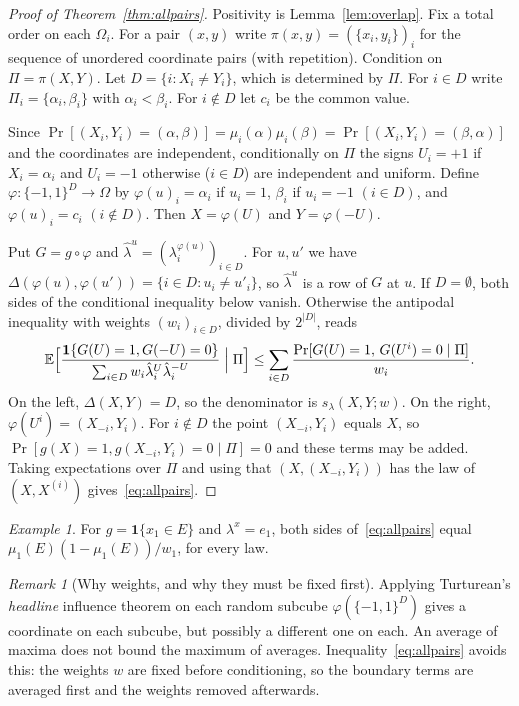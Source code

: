 \documentclass[11pt]{article}
\numberwithin{equation}{section}
\theoremstyle{definition}
\theoremstyle{remark}
\newtheorem{remark}[theorem]{Remark}
\newtheorem{example}[theorem]{Example}
\newcommand{\E}{\mathbb{E}}
\newcommand{\1}{\mathbf 1}
\begin{document}
\begin{proof}[Proof of Theorem~\ref{thm:allpairs}]
Positivity is Lemma~\ref{lem:overlap}. Fix a total order on each $\Omega_i$. For a pair $(x,y)$ write $\pi(x,y)=(\{x_i,y_i\})_{i}$ for the sequence of unordered coordinate pairs (with repetition). Condition on $\Pi=\pi(X,Y)$. Let $D=\{i:X_i\ne Y_i\}$, which is determined by $\Pi$. For $i\in D$ write $\Pi_i=\{\alpha_i,\beta_i\}$ with $\alpha_i<\beta_i$. For $i\notin D$ let $c_i$ be the common value.

Since $\Pr[(X_i,Y_i)=(\alpha,\beta)]=\mu_i(\alpha)\mu_i(\beta)=\Pr[(X_i,Y_i)=(\beta,\alpha)]$ and the coordinates are independent, conditionally on $\Pi$ the signs $U_i=+1$ if $X_i=\alpha_i$ and $U_i=-1$ otherwise ($i\in D$) are independent and uniform. Define $\varphi:\{-1,1\}^D\to\Omega$ by $\varphi(u)_i=\alpha_i$ if $u_i=1$, $\beta_i$ if $u_i=-1$ $(i\in D)$, and $\varphi(u)_i=c_i$ $(i\notin D)$. Then $X=\varphi(U)$ and $Y=\varphi(-U)$.

Put $G=g\circ\varphi$ and $\hat\lambda^u=(\lambda^{\varphi(u)}_i)_{i\in D}$. For $u,u'$ we have $\Delta(\varphi(u),\varphi(u'))=\{i\in D:u_i\ne u'_i\}$, so $\hat\lambda^u$ is a row of $G$ at $u$. If $D=\emptyset$, both sides of the conditional inequality below vanish. Otherwise the antipodal inequality with weights $(w_i)_{i\in D}$, divided by $2^{|D|}$, reads
\[
\E\Bigl[\frac{\1\{G(U)=1,G(-U)=0\}}{\sum_{i\in D}w_i\hat\lambda^U_i\hat\lambda^{-U}_i}\Bigm|\Pi\Bigr]\le\sum_{i\in D}\frac{\Pr[G(U)=1,\,G(U^i)=0\mid\Pi]}{w_i}.
\]
On the left, $\Delta(X,Y)=D$, so the denominator is $s_\lambda(X,Y;w)$. On the right, $\varphi(U^i)=(X_{-i},Y_i)$. For $i\notin D$ the point $(X_{-i},Y_i)$ equals $X$, so $\Pr[g(X)=1,g(X_{-i},Y_i)=0\mid\Pi]=0$ and these terms may be added. Taking expectations over $\Pi$ and using that $(X,(X_{-i},Y_i))$ has the law of $(X,X^{(i)})$ gives~\eqref{eq:allpairs}.
\end{proof}

\begin{example}
For $g=\1\{x_1\in E\}$ and $\lambda^x=e_1$, both sides of~\eqref{eq:allpairs} equal $\mu_1(E)(1-\mu_1(E))/w_1$, for every law.
\end{example}

\begin{remark}[Why weights, and why they must be fixed first]\label{rem:why}
Applying Turturean's \emph{headline} influence theorem on each random subcube $\varphi(\{-1,1\}^D)$ gives a coordinate on each subcube, but possibly a different one on each. An average of maxima does not bound the maximum of averages. Inequality~\eqref{eq:allpairs} avoids this: the weights $w$ are fixed before conditioning, so the boundary terms are averaged first and the weights removed afterwards.
\end{remark}
\end{document}
